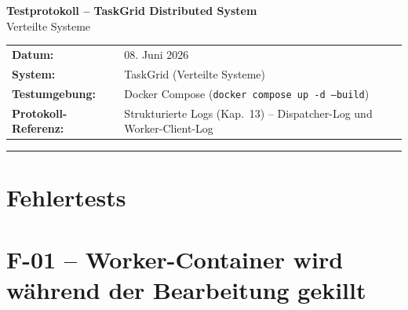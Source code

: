 \documentclass[a4paper,12pt]{article}
\begin{document}
\begin{center}
    {\Large \textbf{Testprotokoll -- TaskGrid Distributed System}}\\[0.5em]
    {\large Verteilte Systeme}\\[1em]
    \begin{tabular}{ll}
        \textbf{Datum:}               & 08. Juni 2026 \\
        \textbf{System:}              & TaskGrid (Verteilte Systeme) \\
        \textbf{Testumgebung:}        & Docker Compose (\texttt{docker compose up -d --build}) \\
        \textbf{Protokoll-Referenz:}  & Strukturierte Logs (Kap.~13) -- Dispatcher-Log und Worker-Client-Log \\
    \end{tabular}
\end{center}

\vspace{1em}
\hrule
\vspace{1.5em}

\section*{Fehlertests}

\newpage
\section*{F-01 -- Worker-Container wird während der Bearbeitung gekillt}
\end{document}
